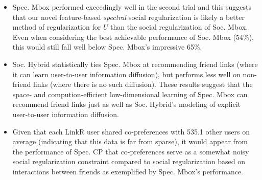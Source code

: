 \begin{itemize}
\item Spec. Mbox performed exceedingly well in the second trial 
and this suggests that our novel feature-based 
\emph{spectral} social regularization is likely
a better method of regularization for $U$ than the social
regularization of Soc. Mbox.  Even when considering the best
achievable performance of Soc. Mbox (54\%), this would still fall well
below Spec. Mbox's impressive 65\%.

\item Soc. Hybrid statistically ties Spec. Mbox at 
recommending friend links (where it can learn user-to-user information
diffusion), but performs less well on non-friend links (where there is
no such diffusion).
%
These results suggest that the space- and
compution-efficient low-dimensional learning of Spec. Mbox can
recommend friend links just as well as Soc. Hybrid's modeling of explicit
user-to-user information diffusion.

\item Given that
each LinkR user shared co-preferences with 535.1 other users on
average (indicating that this data is far from sparse), it would
appear from the performance of Spec. CP that
co-preferences serve as a somewhat noisy social regularization
constraint compared to social regularization based on interactions between
friends as exemplified by Spec. Mbox's performance.

\end{itemize}

